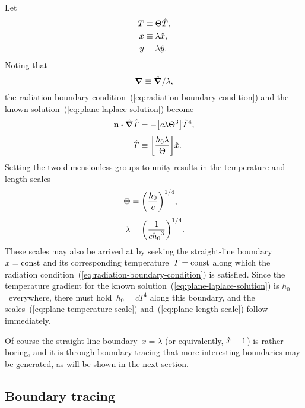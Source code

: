 Let
\begin{align}
  T &\equiv \Theta \hat{T}, \label{eq:plane-temperature-scaling} \\
  x &\equiv \lambda \hat{x}, \label{eq:plane-x-scaling} \\
  y &\equiv \lambda \hat{y}. \label{eq:plane-y-scaling}
\end{align}
Noting that
\begin{equation}
  \mathop{}\!\boldsymbol{\mathbf{\nabla}} \equiv \mathop{}\!\hat{\mathop{}\!\boldsymbol{\mathbf{\nabla}}} / \lambda,
  \label{eq:plane-del-scaling}
\end{equation}
the radiation boundary condition~(\ref{eq:radiation-boundary-condition})
and the known solution~(\ref{eq:plane-laplace-solution})
become
\begin{align}
  \normalvec \dotp \scaleddel \scaled{T}
    &= -\group{c \lambda \Theta^3} \scaled{T}^4,
    \label{eq:plane-scaled-radiation-boundary-condition-with-groups}
    \\[\tallspace]
  \scaled{T}
    &\ideq \group{\frac{h_0 \lambda}{\Theta}} \scaled{x}.
    \label{eq:plane-scaled-laplace-solution-with-groups}
\end{align}
Setting the two dimensionless groups to unity
results in the temperature and length scales
\begin{align}
  \Theta &= \roundbr*{\frac{h_0}{c}}^{1/4},
    \label{eq:plane-temperature-scale} \\[\tallspace]
  \lambda &= \roundbr*{\frac{1}{c {h_0}^3}}^{1/4}.
    \label{eq:plane-length-scale}
\end{align}
These scales may also be arrived at
by seeking the straight-line boundary~$x = \mathrm{const}$
and its corresponding temperature~$T = \mathrm{const}$
along which the radiation condition~(\ref{eq:radiation-boundary-condition})
is satisfied.
Since the temperature gradient
for the known solution~(\ref{eq:plane-laplace-solution})
is $h_0$~everywhere,
there must hold~$h_0 = c T^4$ along this boundary,
and the scales~(\ref{eq:plane-temperature-scale})
and~(\ref{eq:plane-length-scale}) follow immediately.

Of course the straight-line boundary~$x = \lambda$
(or equivalently, $\hat{x} = 1$)
is rather boring,
and it is through boundary tracing
that more interesting boundaries may be generated,
as will be shown in the next section.

\subsection{Boundary tracing}
\label{sec:cartesian.plane.tracing}

